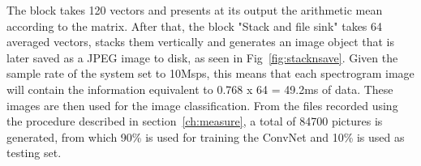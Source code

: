 The block takes 120 vectors and presents at its output the arithmetic mean according to the matrix. After that, the block "Stack and file sink" takes 64 averaged vectors, stacks them vertically and generates an image object that is later saved as a JPEG image to disk, as seen in Fig~\ref{fig:stacknsave}. Given the sample rate of the system set to 10Msps, this means that each spectrogram image will contain the information equivalent to 0.768 x 64 = 49.2ms of data. These images are then used for the image classification. From the files recorded using the procedure described in section~\ref{ch:measure}, a total of 84700 pictures is generated, from which 90\% is used for training the \ac{ConvNet} and 10\% is used as testing set.

